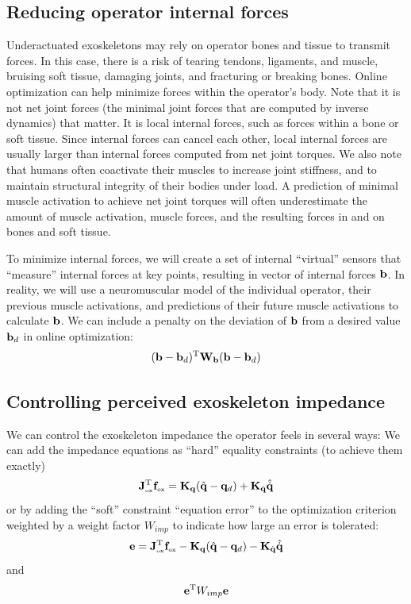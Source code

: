 \documentclass[letterpaper,12pt,fullpage]{article}
\newcommand{\ox}{{\mbox {\tiny ox}}}
\begin{document}
\subsection{Reducing operator internal forces}

Underactuated exoskeletons may rely on operator bones and tissue to transmit forces.
In this case, there is a risk of
tearing tendons, ligaments, and muscle, bruising soft tissue, damaging joints, 
and fracturing or breaking bones. Online optimization can help minimize forces
within the operator's body. Note that it is not net joint forces (the minimal
joint forces that are computed by inverse dynamics) that matter.
It is local internal forces, such as forces within a bone or soft tissue.
Since internal forces can cancel each other,
local internal forces are usually larger than internal forces computed
from net joint torques.
We also note that humans often coactivate their muscles to increase joint stiffness,
and to maintain structural integrity of their bodies under load. A prediction
of minimal muscle activation to achieve net joint torques will often underestimate
the amount of muscle activation, muscle forces, and the resulting forces in and on 
bones and soft tissue.

To minimize internal forces, we will create a set of internal ``virtual'' sensors
that ``measure'' internal forces at key points, resulting in vector of internal
forces ${\bf b}$. In reality, we will use a neuromuscular model of the individual
operator, their previous muscle activations, and predictions of their future
muscle activations to calculate ${\bf b}$.
We can include a penalty on the deviation of ${\bf b}$ from a desired value ${\bf b}_d$
in online optimization:
\begin{equation}
({\bf b} - {\bf b}_d)^{{\rm T}} {\bf W}_{{\bf b}} ({\bf b} - {\bf b}_d)
\end{equation}

\subsection{Controlling perceived exoskeleton impedance}

We can control the exoskeleton impedance the operator feels in several ways:
We can add 
the impedance equations as ``hard'' equality constraints (to achieve them exactly)
\begin{equation}
\mJ_{\ox}^{\tr} {\vf_{\ox}} = \mK_{\vq}( \hat{\vq} - \vq_d ) + \mK_{\dot{\vq}} \hat{\dot{\vq}}
\end{equation}
or by adding the ``soft'' constraint ``equation error'' to the optimization criterion
weighted by a weight factor $W_{imp}$ to indicate
how large an error is tolerated:
\begin{equation}
\ve = \mJ_{\ox}^{\tr} {\vf_{\ox}} - \mK_{\vq}( \hat{\vq} - \vq_d ) - \mK_{\dot{\vq}} \hat{\dot{\vq}}
\end{equation}
and
\begin{equation}
{\bf e}^{{\rm T}} W_{imp} {\bf e}
\end{equation}
\end{document}

